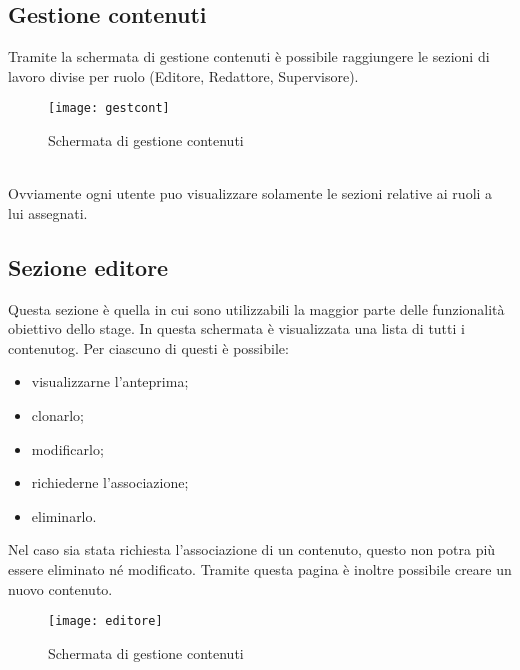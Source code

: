 \subsection{Gestione contenuti}
Tramite la schermata di gestione contenuti è possibile raggiungere le sezioni di lavoro divise per ruolo (Editore, Redattore, Supervisore).
\begin{figure}[h]
    \begin{center}
    \texttt{[image: gestcont]}
    \caption{Schermata di gestione contenuti}
    \label{fig:figure22}
    \end{center}
\end{figure}
\\Ovviamente ogni utente puo visualizzare solamente le sezioni relative ai ruoli a lui assegnati.

\subsection{Sezione editore}
Questa sezione è quella in cui sono utilizzabili la maggior parte delle funzionalità obiettivo dello stage. In questa schermata è visualizzata una lista di tutti i \gls{contenutog}. Per ciascuno di questi è possibile:
\begin{itemize}
    \item visualizzarne l'anteprima;
    \item clonarlo;
    \item modificarlo;
    \item richiederne l'associazione;
    \item eliminarlo.
\end{itemize}
Nel caso sia stata richiesta l'associazione di un contenuto, questo non potra più essere eliminato né modificato.
Tramite questa pagina è inoltre possibile creare un nuovo contenuto.
\begin{figure}[h]
    \begin{center}
    \texttt{[image: editore]}
    \caption{Schermata di gestione contenuti}
    \label{fig:figure23}
    \end{center}
\end{figure}

